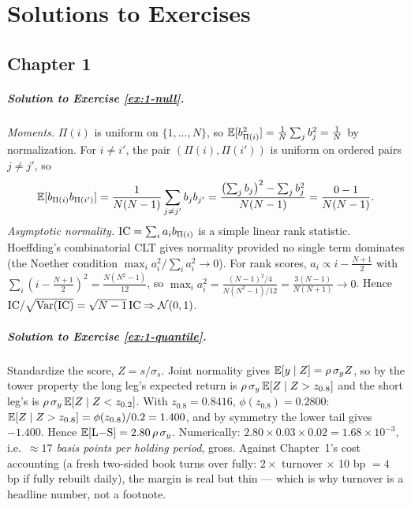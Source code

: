 \chapter{Solutions to Exercises}\label{app:solutions}

\section*{Chapter 1}

\paragraph{Solution to Exercise \ref{ex:1-null}.}
\emph{Moments.} $\Pi(i)$ is uniform on $\{1,\dots,N\}$, so
$\mathbb{E}[b_{\Pi(i)}^2] = \frac1N \sum_j b_j^2 = \frac1N$ by normalization. For
$i \ne i'$, the pair $(\Pi(i), \Pi(i'))$ is uniform on ordered pairs
$j \ne j'$, so
\[
  \mathbb{E}[b_{\Pi(i)} b_{\Pi(i')}]
  = \frac{1}{N(N-1)} \sum_{j \ne j'} b_j b_{j'}
  = \frac{\bigl(\sum_j b_j\bigr)^2 - \sum_j b_j^2}{N(N-1)}
  = \frac{0 - 1}{N(N-1)} .
\]
\emph{Asymptotic normality.} $\mathrm{IC} = \sum_i a_i b_{\Pi(i)}$ is a simple
linear rank statistic. Hoeffding's combinatorial CLT gives normality
provided no single term dominates (the Noether condition
$\max_i a_i^2 / \sum_i a_i^2 \to 0$). For rank scores,
$a_i \propto i - \frac{N+1}{2}$ with
$\sum_i (i - \frac{N+1}{2})^2 = \frac{N(N^2-1)}{12}$, so
$\max_i a_i^2 = \frac{(N-1)^2/4}{N(N^2-1)/12} = \frac{3(N-1)}{N(N+1)} \to 0$.
Hence $\mathrm{IC}/\sqrt{\operatorname{Var}(\mathrm{IC})} = \sqrt{N-1}\,\mathrm{IC} \Rightarrow \mathcal{N}(0,1)$.

\paragraph{Solution to Exercise \ref{ex:1-quantile}.}
Standardize the score, $Z = s/\sigma_s$. Joint normality gives
$\mathbb{E}[y \mid Z] = \rho\,\sigma_y Z$, so by the tower property the long leg's
expected return is $\rho\,\sigma_y\,\mathbb{E}[Z \mid Z > z_{0.8}]$ and the short
leg's is $\rho\,\sigma_y\,\mathbb{E}[Z \mid Z < z_{0.2}]$. With
$z_{0.8} = 0.8416$, $\phi(z_{0.8}) = 0.2800$:
$\mathbb{E}[Z \mid Z > z_{0.8}] = \phi(z_{0.8})/0.2 = 1.400$, and by symmetry the
lower tail gives $-1.400$. Hence
$\mathbb{E}[\mathrm{L{-}S}] = 2.80\,\rho\,\sigma_y$. Numerically:
$2.80 \times 0.03 \times 0.02 = 1.68\times10^{-3}$, i.e.\
\emph{$\approx 17$ basis points per holding period}, gross. Against
Chapter~1's cost accounting (a fresh two-sided book turns over fully:
$2\times$ turnover $\times$ 10 bp $= 4$ bp if fully rebuilt daily), the
margin is real but thin --- which is why turnover is a headline number, not
a footnote.

